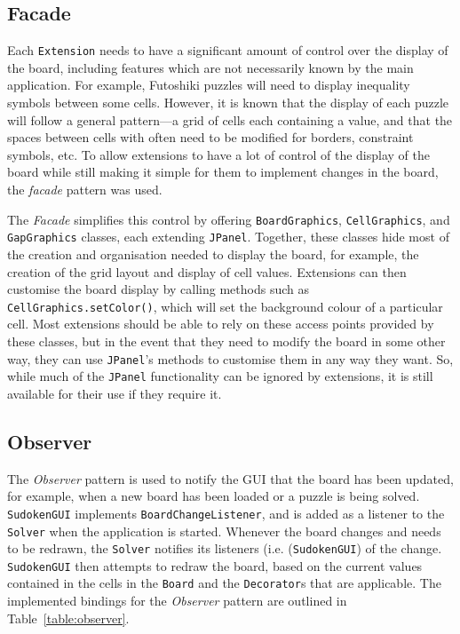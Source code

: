 \documentclass[a4paper, 11pt]{article}
\begin{document}
\subsection{Facade}

Each \texttt{Extension} needs to have a significant amount of control over the display of the board, including features which are not necessarily known by the main application. For example, Futoshiki puzzles will need to display inequality symbols between some cells. However, it is known that the display of each puzzle will follow a general pattern---a grid of cells each containing a value, and that the spaces between cells with often need to be modified for borders, constraint symbols, etc. To allow extensions to have a lot of control of the display of the board while still making it simple for them to implement changes in the board, the \textit{facade} pattern was used.

The \textit{Facade} simplifies this control by offering \texttt{BoardGraphics}, \texttt{CellGraphics}, and \texttt{GapGraphics} classes, each extending \texttt{JPanel}. Together, these classes hide most of the creation and organisation needed to display the board, for example, the creation of the grid layout and display of cell values. Extensions can then customise the board display by calling methods such as \texttt{CellGraphics.setColor()}, which will set the background colour of a particular cell. Most extensions should be able to rely on these access points provided by these classes, but in the event that they need to modify the board in some other way, they can use \texttt{JPanel}'s methods to customise them in any way they want. So, while much of the \texttt{JPanel} functionality can be ignored by extensions, it is still available for their use if they require it.

\subsection{Observer}

The \textit{Observer} pattern is used to notify the GUI that the board has been updated, for example, when a new board has been loaded or a puzzle is being solved. \texttt{SudokenGUI} implements \texttt{BoardChangeListener}, and is added as a listener to the \texttt{Solver} when the application is started. Whenever the board changes and needs to be redrawn, the \texttt{Solver} notifies its listeners (i.e. (\texttt{SudokenGUI}) of the change. \texttt{SudokenGUI} then attempts to redraw the board, based on the current values contained in the cells in the \texttt{Board} and the \texttt{Decorator}s that are applicable. The implemented bindings for the \textit{Observer} pattern are outlined in Table~\ref{table:observer}.
\end{document}

